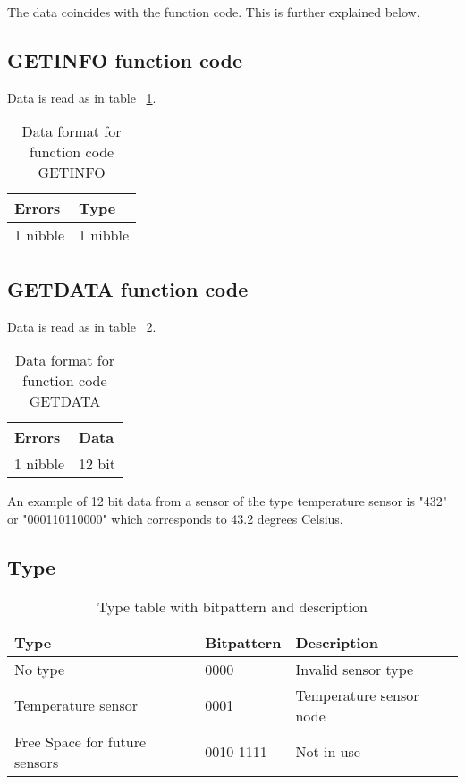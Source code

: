 The data coincides with the function code. This is further explained below.
\subsection{GETINFO function code}
Data is read as in table ~\ref{table:Datagetinfo}.
\begin{table}[H]
\centering
\begin{tabular}{|l|l|}
	\hline
	Errors & Type \\ \hline
	1 nibble & 1 nibble \\
	\hline
\end{tabular}
\caption{Data format for function code GETINFO }
\label{table:Datagetinfo}
\end{table}
\subsection{GETDATA function code}
Data is read as in table ~\ref{table:Datagetdata}.
\begin{table}[H]
\centering
\begin{tabular}{|l|l|}
	\hline
	Errors & Data \\ \hline
	1 nibble &  12 bit \\
	\hline
\end{tabular}
\caption{Data format for function code GETDATA }
\label{table:Datagetdata}
\end{table}
An example of 12 bit data from a sensor of the type temperature sensor is "432" or "000110110000" which corresponds to 43.2 degrees Celsius.

\subsection{Type}
\begin{table}[H]
\centering
\begin{tabular}{|l|l|l|}
	\hline
	Type & Bitpattern & Description \\ 
	\hline
	No type 	& 0000 & Invalid sensor type \\
	\hline
	Temperature sensor & 0001 & Temperature sensor node \\
	\hline
	Free Space for future sensors & 0010-1111 & Not in use \\ \hline
	
\end{tabular}
\caption{Type table with bitpattern and description}
\label{table:typetable}
\end{table}

